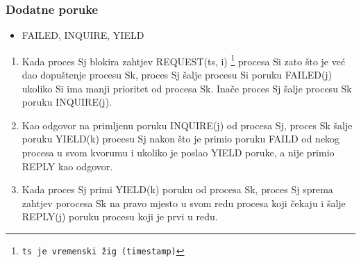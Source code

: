 \documentclass[11pt]{beamer}
\begin{document}
\begin{frame}
	\frametitle{Dodatne poruke}
	\begin{itemize}
		\item FAILED, INQUIRE, YIELD
	\end{itemize}
	
	
	\begin{enumerate}
		\item Kada proces Sj blokira zahtjev REQUEST(ts, i) \footnote{\texttt{ts je vremenski žig (timestamp)}} procesa Si zato što je već dao dopuštenje procesu Sk, proces Sj šalje procesu Si poruku FAILED(j) ukoliko Si ima manji prioritet od procesa Sk. Inače proces Sj šalje procesu Sk poruku INQUIRE(j).
		\item Kao odgovor na primljenu poruku INQUIRE(j) od procesa Sj, proces Sk šalje poruku YIELD(k) procesu Sj nakon što je primio poruku FAILD od nekog procesa u svom kvorumu i ukoliko je poslao YIELD poruke, a nije primio REPLY kao odgovor.
		\item Kada proces Sj primi YIELD(k) poruku od procesa Sk, proces Sj sprema zahtjev porocesa Sk na pravo mjesto u svom redu procesa koji čekaju i šalje REPLY(j) poruku procesu koji je prvi u redu.
	\end{enumerate}
\end{frame}
\end{document}
